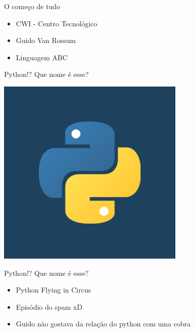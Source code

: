 \begin{frame}{O começo de tudo}
    \begin{itemize}
        \item  CWI - Centro Tecnológico
        \item Guido Van Rossum
        \item Linguagem ABC        
    \end{itemize}
\end{frame}
%
\begin{frame}{Python!? Que nome é esse? }
	\begin{center}
		\includegraphics[scale=0.5]{img/python.png}
	\end{center}
\end{frame}

\begin{frame}{Python!? Que nome é esse? }
    \begin{itemize}
        \item Python Flying in Circus
        \item Episódio do spam xD
		\item Guido não gostava da relação do python com uma cobra        
    \end{itemize}
\end{frame}
%

